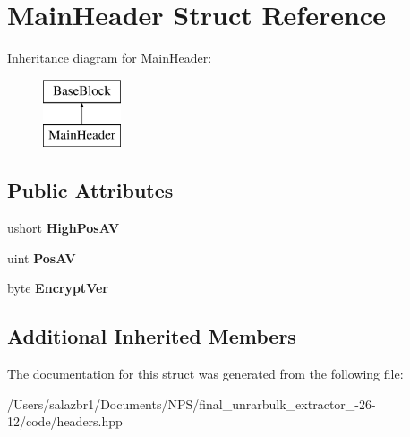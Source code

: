 \hypertarget{struct_main_header}{\section{Main\-Header Struct Reference}
\label{struct_main_header}
}
Inheritance diagram for Main\-Header\-:\begin{figure}[H]
\begin{center}
\leavevmode
\includegraphics[height=2.000000cm]{struct_main_header}
\end{center}
\end{figure}
\subsection*{Public Attributes}
\begin{DoxyCompactItemize}
\item 
\hypertarget{struct_main_header_a7bde589c13d97233aaece964d12cf7af}{ushort {\bfseries High\-Pos\-A\-V}}\label{struct_main_header_a7bde589c13d97233aaece964d12cf7af}

\item 
\hypertarget{struct_main_header_a97917545b4b775253b60b8d7f83e112e}{uint {\bfseries Pos\-A\-V}}\label{struct_main_header_a97917545b4b775253b60b8d7f83e112e}

\item 
\hypertarget{struct_main_header_a0a500814f7e4758d8c0bc14108b05aa0}{byte {\bfseries Encrypt\-Ver}}\label{struct_main_header_a0a500814f7e4758d8c0bc14108b05aa0}

\end{DoxyCompactItemize}
\subsection*{Additional Inherited Members}


The documentation for this struct was generated from the following file\-:\begin{DoxyCompactItemize}
\item 
/\-Users/salazbr1/\-Documents/\-N\-P\-S/final\-\_\-unrarbulk\-\_\-extractor\-\_-\/26-\/12/code/headers.\-hpp\end{DoxyCompactItemize}
